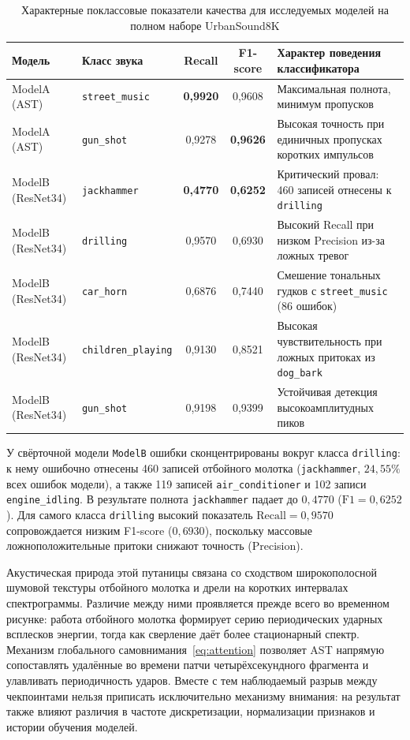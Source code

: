 \documentclass[pdflatex,sn-mathphys-num]{sn-jnl}
\begin{document}
\begin{table}[htbp]
\caption{Характерные поклассовые показатели качества для исследуемых моделей на полном наборе UrbanSound8K}\label{tab:class_metrics}
\footnotesize
\setlength{\tabcolsep}{4.5pt}
\begin{tabular}{|l|l|c|c|p{6.0cm}|}
\hline
Модель & Класс звука & Recall & F1-score & Характер поведения классификатора \\
\hline
ModelA (AST) & \texttt{street\_music} & \textbf{0,9920} & 0,9608 & Максимальная полнота, минимум пропусков \\
\hline
ModelA (AST) & \texttt{gun\_shot} & 0,9278 & \textbf{0,9626} & Высокая точность при единичных пропусках коротких импульсов \\
\hline
ModelB (ResNet34) & \texttt{jackhammer} & \textbf{0,4770} & \textbf{0,6252} & Критический провал: 460 записей отнесены к \texttt{drilling} \\
\hline
ModelB (ResNet34) & \texttt{drilling} & 0,9570 & 0,6930 & Высокий Recall при низком Precision из-за ложных тревог \\
\hline
ModelB (ResNet34) & \texttt{car\_horn} & 0,6876 & 0,7440 & Смешение тональных гудков с \texttt{street\_music} (86 ошибок) \\
\hline
ModelB (ResNet34) & \texttt{children\_playing} & 0,9130 & 0,8521 & Высокая чувствительность при ложных притоках из \texttt{dog\_bark} \\
\hline
ModelB (ResNet34) & \texttt{gun\_shot} & 0,9198 & 0,9399 & Устойчивая детекция высокоамплитудных пиков \\
\hline
\end{tabular}
\end{table}
\FloatBarrier

У свёрточной модели \texttt{ModelB} ошибки сконцентрированы вокруг класса \texttt{drilling}: к нему ошибочно отнесены 460 записей отбойного молотка (\texttt{jackhammer}, $24{,}55\%$ всех ошибок модели), а также 119 записей \texttt{air\_conditioner} и 102 записи \texttt{engine\_idling}. В результате полнота \texttt{jackhammer} падает до $0{,}4770$ ($\text{F1} = 0{,}6252$). Для самого класса \texttt{drilling} высокий показатель $\text{Recall} = 0{,}9570$ сопровождается низким F1-score ($0{,}6930$), поскольку массовые ложноположительные притоки снижают точность (Precision).

Акустическая природа этой путаницы связана со сходством широкополосной шумовой текстуры отбойного молотка и дрели на коротких интервалах спектрограммы. Различие между ними проявляется прежде всего во временном рисунке: работа отбойного молотка формирует серию периодических ударных всплесков энергии, тогда как сверление даёт более стационарный спектр. Механизм глобального самовнимания~\eqref{eq:attention} позволяет AST напрямую сопоставлять удалённые во времени патчи четырёхсекундного фрагмента и улавливать периодичность ударов. Вместе с тем наблюдаемый разрыв между чекпоинтами нельзя приписать исключительно механизму внимания: на результат также влияют различия в частоте дискретизации, нормализации признаков и истории обучения моделей.
\end{document}
